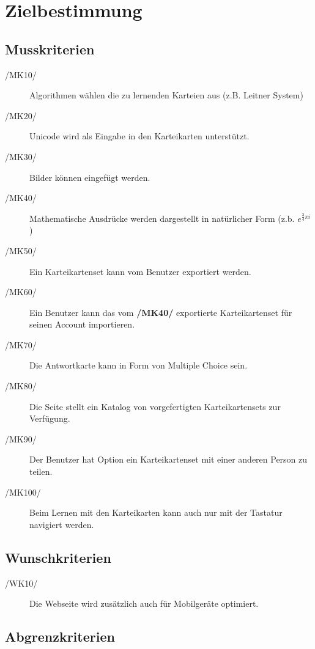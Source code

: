 \section{Zielbestimmung}

\subsection{Musskriterien}
\begin{description}
	\item[/MK10/] Algorithmen wählen die zu lernenden Karteien aus (z.B. Leitner System)
	\item[/MK20/] Unicode wird als Eingabe in den Karteikarten unterstützt.
	\item[/MK30/] Bilder können eingefügt werden.
	\item[/MK40/] Mathematische Ausdrücke werden dargestellt in natürlicher Form (z.b. \( e^{\frac{3}{4}\pi i}\))
	\item[/MK50/] Ein Karteikartenset kann vom Benutzer exportiert werden.
	\item[/MK60/] Ein Benutzer kann das vom \textbf{/MK40/} exportierte Karteikartenset für seinen Account importieren.
	\item[/MK70/] Die Antwortkarte kann in Form von Multiple Choice sein.
	\item[/MK80/] Die Seite stellt ein Katalog von vorgefertigten Karteikartensets zur Verfügung.
	\item[/MK90/] Der Benutzer hat Option ein Karteikartenset mit einer anderen Person zu teilen.
	\item[/MK100/] Beim Lernen mit den Karteikarten kann auch nur mit der Tastatur navigiert werden.
\end{description}

\subsection{Wunschkriterien}
\begin{description}
	\item[/WK10/] Die Webseite wird zusätzlich auch für Mobilgeräte optimiert.
\end{description}

\subsection{Abgrenzkriterien}